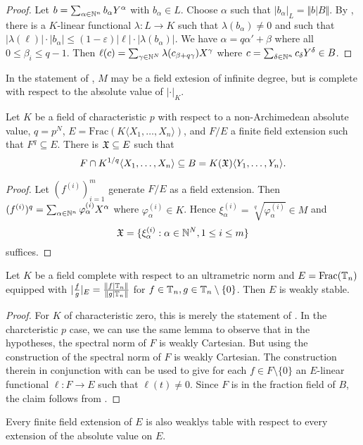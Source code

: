 \begin{proof}
    Let $b=\sum_{\alpha\in\mathbb{N}^{n}}b_{\alpha}Y^{\alpha}$ with $b_{\alpha}\in L$. Choose $\alpha$ such that $|b_{\alpha}|_{L}=\Vert b|B\Vert$. By , there is a $K$-linear functional $\lambda:L\to K$ such that $\lambda(b_{\alpha})\neq0$ and such that $|\lambda(\ell)|\cdot|b_{\alpha}|\leq(1-\varepsilon)|\ell|\cdot|\lambda(b_{\alpha})|$. We have $\alpha=q\alpha'+\beta$ where all $0\leq \beta_{i}\leq q-1$. Then $\ell(c)=\sum_{\gamma\in\mathbb{N}^{N}}\lambda(c_{\beta+q\gamma})X^{\gamma}$ where $c=\sum_{\delta\in\mathbb{N}^{n}}c_{\delta}Y^{\delta}\in B$. 
\end{proof}
\begin{remark}
    In the statement of , $M$ may be a field extesion of infinite degree, but is complete with respect to the absolute value of $|\cdot|_{K}$. 
\end{remark}
\begin{lemma}\label{lem: existence of finite generators of extension}
    Let $K$ be a field of characteristic $p$ with respect to a non-Archimedean absolute value, $q=p^{N}$, $E=\mathrm{Frac}(K\langle X_{1},\dots,X_{n}\rangle)$, and $F/E$ a finite field extension such that $F^{q}\subseteq E$. There is $\mathfrak{X}\subseteq E$ such that 
    $$F\cap K^{1/q}\langle X_{1},\dots,X_{n}\rangle\subseteq B=K(\mathfrak{X})\langle Y_{1},\dots,Y_{n}\rangle.$$
\end{lemma}
\begin{proof}
    Let $(f^{(i)})_{i=1}^{m}$ generate $F/E$ as a field extension. Then $(f^{(i)})^{q}=\sum_{\alpha\in\mathbb{N}^{n}}\varphi_{\alpha}^{(i)}X^{\alpha}$ where $\varphi_{\alpha}^{(i)}\in K$. Hence $\xi_{\alpha}^{(i)}=\sqrt[q]{\varphi_{\alpha}^{(i)}}\in M$ and 
    $$\mathfrak{X}=\{\xi_{\alpha}^{(i)}:\alpha\in\mathbb{N}^{N},1\leq i\leq m\}$$
    suffices. 
\end{proof}
\begin{proposition}\label{prop: fractions of Tate algebra is weakly stable}
    Let $K$ be a field complete with respect to an ultrametric norm and $E=\mathrm{Frac}(\mathbb{T}_{n})$ equipped with $|\frac{f}{g}|_{E}=\frac{\Vert f|\mathbb{T}_{n}\Vert}{\Vert g|\mathbb{T}_{n}\Vert}$ for $f\in\mathbb{T}_{n},g\in\mathbb{T}_{n}\setminus\{0\}$. Then $E$ is weakly stable. 
\end{proposition}
\begin{proof}
    For $K$ of characteristic zero, this is merely the statement of . In the charcteristic $p$ case, we can use the same lemma to observe that in the hypotheses, the spectral norm of $F$ is weakly Cartesian. But using the construction of  the spectral norm of $F$ is weakly Cartesian. The construction therein in conjunction with  can be used to give for each $f\in F\setminus\{0\}$ an $E$-linear functional $\ell:F\to E$ such that $\ell(t)\neq0$. Since $F$ is in the fraction field of $B$, the claim follows from . 
\end{proof}
\begin{remark}
    Every finite field extension of $E$ is also weaklys table with respect to every extension of the absolute value on $E$. 
\end{remark}